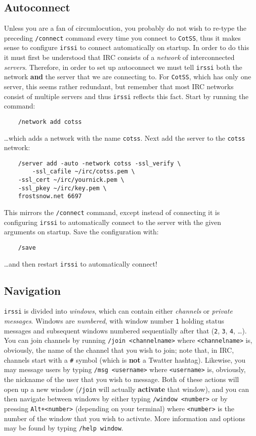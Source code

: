 \documentclass{article}
\begin{document}
{\subsection{Autoconnect}
Unless you are a fan of circumlocution, you probably do not wish to re-type the preceding \texttt{/connect} command every time you connect to \texttt{CotSS}, thus it makes sense to configure \texttt{irssi} to connect automatically on startup.  In order to do this it must first be understood that IRC consists of a \textit{network} of interconnected \textit{servers}.  Therefore, in order to set up autoconnect we must tell \texttt{irssi} both the network \textbf{and} the server that we are connecting to.  For \texttt{CotSS}, which has only one server, this seems rather redundant, but remember that most IRC networks consist of multiple servers and thus \texttt{irssi} reflects this fact.  Start by running the command:
\begin{lstlisting}
    /network add cotss
\end{lstlisting}
\ldots which adds a network with the name \texttt{cotss}.  Next add the server to the \texttt{cotss} network:
\begin{lstlisting}
    /server add -auto -network cotss -ssl_verify \
        -ssl_cafile ~/irc/cotss.pem \
	-ssl_cert ~/irc/yournick.pem \
	-ssl_pkey ~/irc/key.pem \
	frostsnow.net 6697
\end{lstlisting}
This mirrors the \texttt{/connect} command, except instead of connecting it is configuring \texttt{irssi} to automatically connect to the server with the given arguments on startup.  Save the configuration with:
\begin{lstlisting}
    /save
\end{lstlisting}
\ldots and then restart \texttt{irssi} to automatically connect!

\subsection{Navigation}
\texttt{irssi} is divided into \textit{windows}, which can contain either \textit{channels} or \textit{private messages}.  Windows are \textit{numbered}, with window number \texttt{1} holding status messages and subsequent windows numbered sequentially after that (\texttt{2}, \texttt{3}, \texttt{4}, \ldots).  You can join channels by running \texttt{/join <channelname>} where \texttt{<channelname>} is, obviously, the name of the channel that you wish to join; note that, in IRC, channels start with a \texttt{\#} symbol (which is \textbf{not} a Twatter hashtag).  Likewise, you may message users by typing \texttt{/msg <username>} where \texttt{<username>} is, obviously, the nickname of the user that you wish to message.  Both of these actions will open up a new window (\texttt{/join} will actually \textbf{activate} that window), and you can then navigate between windows by either typing \texttt{/window <number>} or by pressing \texttt{Alt+<number>} (depending on your terminal) where \texttt{<number>} is the number of the window that you wish to activate.  More information and options may be found by typing \texttt{/help window}.

}
\end{document}
